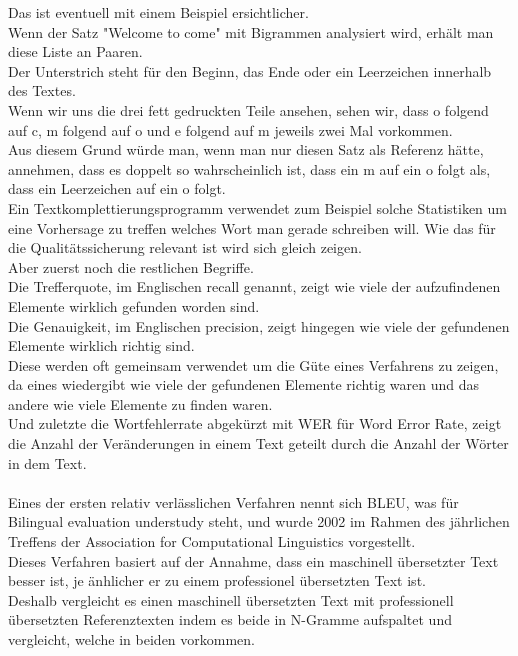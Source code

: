 \documentclass{article}
\begin{document}
Das ist eventuell mit einem Beispiel ersichtlicher. \\
Wenn der Satz "Welcome to come" mit Bigrammen analysiert wird, erhält man diese Liste an Paaren. \\
Der Unterstrich steht für den Beginn, das Ende oder ein Leerzeichen innerhalb des Textes. \\
Wenn wir uns die drei fett gedruckten Teile ansehen, sehen wir, dass o folgend auf c, m folgend auf o und e folgend auf m jeweils zwei Mal vorkommen. \\
Aus diesem Grund würde man, wenn man nur diesen Satz als Referenz hätte, annehmen, dass es doppelt so wahrscheinlich ist, dass ein m auf ein o folgt als, dass ein Leerzeichen auf ein o folgt. \\
Ein Textkomplettierungsprogramm verwendet zum Beispiel solche Statistiken um eine Vorhersage zu treffen welches Wort man gerade schreiben will. 
Wie das für die Qualitätssicherung relevant ist wird sich gleich zeigen. \\
Aber zuerst noch die restlichen Begriffe. \\
Die Trefferquote, im Englischen recall genannt, zeigt wie viele der aufzufindenen Elemente wirklich gefunden worden sind. \\
Die Genauigkeit, im Englischen precision, zeigt hingegen wie viele der gefundenen Elemente wirklich richtig sind. \\
Diese werden oft gemeinsam verwendet um die Güte eines Verfahrens zu zeigen, da eines wiedergibt wie viele der gefundenen Elemente richtig waren und das andere wie viele Elemente zu finden waren. \\
Und zuletzte die Wortfehlerrate abgekürzt mit WER für Word Error Rate, zeigt die Anzahl der Veränderungen in einem Text geteilt durch die Anzahl der Wörter in dem Text.\\
\\
Eines der ersten relativ verlässlichen Verfahren nennt sich BLEU, was für Bilingual evaluation understudy steht, und wurde 2002 im Rahmen des jährlichen Treffens der Association for Computational Linguistics vorgestellt. \\
Dieses Verfahren basiert auf der Annahme, dass ein maschinell übersetzter Text besser ist, je änhlicher er zu einem professionel übersetzten Text ist. \\
Deshalb vergleicht es einen maschinell übersetzten Text mit professionell übersetzten Referenztexten indem es beide in N-Gramme aufspaltet und vergleicht, welche in beiden vorkommen. \\
\end{document}
